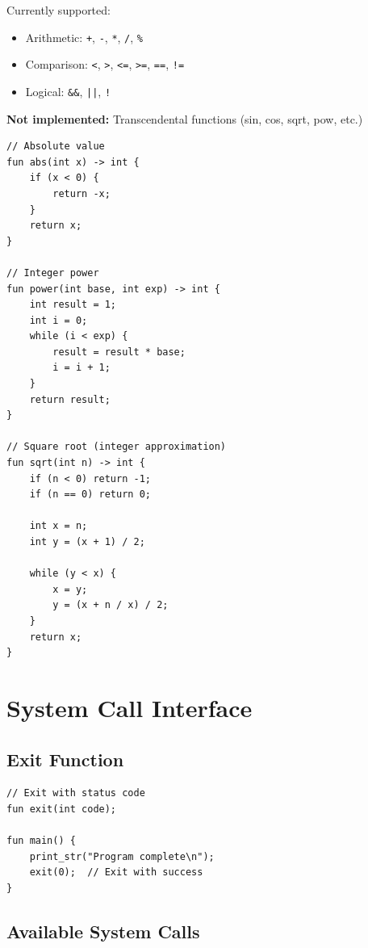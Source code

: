 \documentclass[12pt,a4paper,oneside]{book}
\newcommand{\code}[1]{\texttt{#1}}
\begin{document}
Currently supported:
\begin{itemize}
    \item Arithmetic: \code{+}, \code{-}, \code{*}, \code{/}, \code{\%}
    \item Comparison: \code{<}, \code{>}, \code{<=}, \code{>=}, \code{==}, \code{!=}
    \item Logical: \code{\&\&}, \code{||}, \code{!}
\end{itemize}

\textbf{Not implemented:} Transcendental functions (sin, cos, sqrt, pow, etc.)

\begin{lstlisting}[style=algo, caption={User-Implemented Math Functions}]
// Absolute value
fun abs(int x) -> int {
    if (x < 0) {
        return -x;
    }
    return x;
}

// Integer power
fun power(int base, int exp) -> int {
    int result = 1;
    int i = 0;
    while (i < exp) {
        result = result * base;
        i = i + 1;
    }
    return result;
}

// Square root (integer approximation)
fun sqrt(int n) -> int {
    if (n < 0) return -1;
    if (n == 0) return 0;
    
    int x = n;
    int y = (x + 1) / 2;
    
    while (y < x) {
        x = y;
        y = (x + n / x) / 2;
    }
    return x;
}
\end{lstlisting}

\section{System Call Interface}

\subsection{Exit Function}

\begin{lstlisting}[style=algo, caption={Program Termination}]
// Exit with status code
fun exit(int code);

fun main() {
    print_str("Program complete\n");
    exit(0);  // Exit with success
}
\end{lstlisting}

\subsection{Available System Calls}
\end{document}

